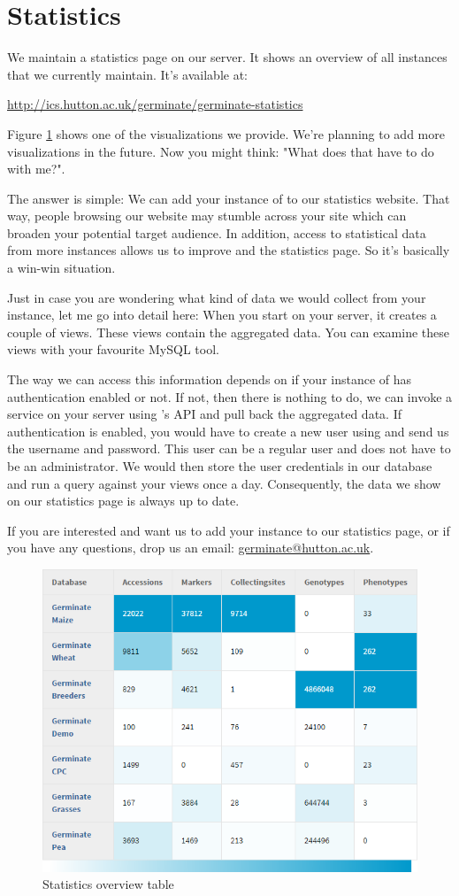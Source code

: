 \section{Statistics}
We maintain a {\germinate} statistics page on our server. It shows an overview of all {\germinate} instances that we currently maintain. It's available at:
\begin{center}
	\url{http://ics.hutton.ac.uk/germinate/germinate-statistics}
\end{center}
\noindent
Figure \ref{fig:statistics-overview-table} shows one of the visualizations we provide. We're planning to add more visualizations in the future. Now you might think: "What does that have to do with me?".

The answer is simple: We can add your instance of {\germinate} to our statistics website. That way, people browsing our website may stumble across your site which can broaden your potential target audience. In addition, access to statistical data from more {\germinate} instances allows us to improve {\germinate} and the statistics page. So it's basically a win-win situation.

Just in case you are wondering what kind of data we would collect from your {\germinate} instance, let me go into detail here: When you start {\germinate} on your server, it creates a couple of views. These views contain the aggregated data. You can examine these views with your favourite MySQL tool.

The way we can access this information depends on if your instance of {\germinate} has authentication enabled or not. If not, then there is nothing to do, we can invoke a service on your server using {\germinate}'s API and pull back the aggregated data. If authentication is enabled, you would have to create a new user using {\gatekeeper} and send us the username and password. This user can be a regular user and does not have to be an administrator. We would then store the user credentials in our database and run a query against your views once a day. Consequently, the data we show on our statistics page is always up to date.

If you are interested and want us to add your {\germinate} instance to our statistics page, or if you have any questions, drop us an email: \url{germinate@hutton.ac.uk}.

\begin{figure}
	\centering
	\includegraphics[scale=0.6]{img/statistics/overview-table.png}
	\caption{Statistics overview table}
	\label{fig:statistics-overview-table}
\end{figure}